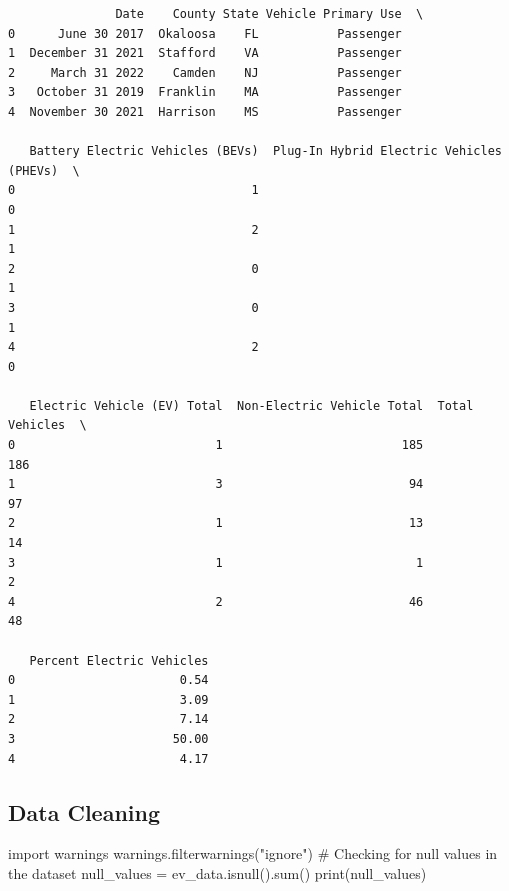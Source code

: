 \documentclass[
  letterpaper,
  DIV=11,
  numbers=noendperiod]{scrartcl}
\newenvironment{Shaded}{\begin{snugshade}}{\end{snugshade}}
\newcommand{\BuiltInTok}[1]{\textcolor[rgb]{0.00,0.23,0.31}{#1}}
\newcommand{\CommentTok}[1]{\textcolor[rgb]{0.37,0.37,0.37}{#1}}
\newcommand{\ImportTok}[1]{\textcolor[rgb]{0.00,0.46,0.62}{#1}}
\newcommand{\NormalTok}[1]{\textcolor[rgb]{0.00,0.23,0.31}{#1}}
\newcommand{\OperatorTok}[1]{\textcolor[rgb]{0.37,0.37,0.37}{#1}}
\newcommand{\StringTok}[1]{\textcolor[rgb]{0.13,0.47,0.30}{#1}}
\begin{document}
\begin{verbatim}
               Date    County State Vehicle Primary Use  \
0      June 30 2017  Okaloosa    FL           Passenger   
1  December 31 2021  Stafford    VA           Passenger   
2     March 31 2022    Camden    NJ           Passenger   
3   October 31 2019  Franklin    MA           Passenger   
4  November 30 2021  Harrison    MS           Passenger   

   Battery Electric Vehicles (BEVs)  Plug-In Hybrid Electric Vehicles (PHEVs)  \
0                                 1                                         0   
1                                 2                                         1   
2                                 0                                         1   
3                                 0                                         1   
4                                 2                                         0   

   Electric Vehicle (EV) Total  Non-Electric Vehicle Total  Total Vehicles  \
0                            1                         185             186   
1                            3                          94              97   
2                            1                          13              14   
3                            1                           1               2   
4                            2                          46              48   

   Percent Electric Vehicles  
0                       0.54  
1                       3.09  
2                       7.14  
3                      50.00  
4                       4.17  
\end{verbatim}

\hypertarget{data-cleaning}{%
\subsection{Data Cleaning}\label{data-cleaning}}

\begin{Shaded}
\begin{Highlighting}[]
\ImportTok{import}\NormalTok{ warnings}
\NormalTok{warnings.filterwarnings(}\StringTok{"ignore"}\NormalTok{)}
\CommentTok{\# Checking for null values in the dataset}
\NormalTok{null\_values }\OperatorTok{=}\NormalTok{ ev\_data.isnull().}\BuiltInTok{sum}\NormalTok{()}
\BuiltInTok{print}\NormalTok{(null\_values)}
\end{Highlighting}
\end{Shaded}
\end{document}
